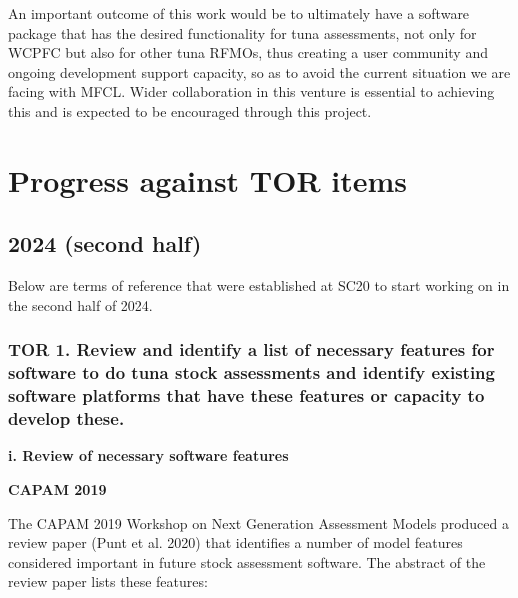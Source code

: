 \documentclass{SCreport}
\begin{document}
An important outcome of this work would be to ultimately have a software package
that has the desired functionality for tuna assessments, not only for WCPFC but
also for other tuna RFMOs, thus creating a user community and ongoing
development support capacity, so as to avoid the current situation we are facing
with MFCL. Wider collaboration in this venture is essential to achieving this
and is expected to be encouraged through this project.

\section{Progress against TOR items}

\subsection{2024 (second half)}

Below are terms of reference that were established at SC20 to start working on
in the second half of 2024.

\subsubsection{TOR 1. Review and identify a list of necessary features for software to
  do tuna stock assessments and identify existing software platforms that have
  these features or capacity to develop these.}

\vspace{2ex}

\textbf{i. Review of necessary software features}

\vspace{2ex}

\textbf{CAPAM 2019}

\vspace{1ex}

The CAPAM 2019 Workshop on Next Generation Assessment Models produced a review
paper (Punt et al. 2020) that identifies a number of model features considered
important in future stock assessment software. The abstract of the review paper
lists these features:
\end{document}
